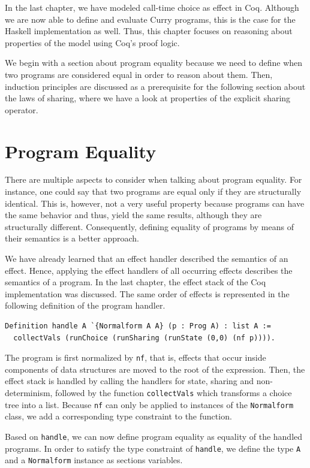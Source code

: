 \documentclass[a4paper, 11pt, fleqn, twoside, abstract=on]{scrreprt}
\newcommand{\cinl}[1]{\texttt{#1}}
\begin{document}
In the last chapter, we have modeled call-time choice as effect in Coq.
Although we are now able to define and evaluate Curry programs, this is the case for the Haskell implementation as well.
Thus, this chapter focuses on reasoning about properties of the model using Coq's proof logic.

We begin with a section about program equality because we need to define when two programs are considered equal in order to reason about them.
Then, induction principles are discussed as a prerequisite for the following section about the laws of sharing, where we have a look at properties
of the explicit sharing operator.

\section{Program Equality}

There are multiple aspects to consider when talking about program equality.
For instance, one could say that two programs are equal only if they are structurally identical.
This is, however, not a very useful property because programs can have the same behavior and thus, yield the same results, although they are structurally different.
Consequently, defining equality of programs by means of their semantics is a better approach.

We have already learned that an effect handler described the semantics of an effect.
Hence, applying the effect handlers of all occurring effects describes the semantics of a program.
In the last chapter, the effect stack of the Coq implementation was discussed.
The same order of effects is represented in the following definition of the program handler.

\begin{verbatim}
Definition handle A `{Normalform A A} (p : Prog A) : list A :=
  collectVals (runChoice (runSharing (runState (0,0) (nf p)))).
\end{verbatim}
\noindent
The program is first normalized by \cinl{nf}, that is, effects that occur inside components of data structures are moved to the root of the expression.
Then, the effect stack is handled by calling the handlers for state, sharing and non-determinism, followed by the function \cinl{collectVals} which transforms a choice tree into a list.
Because \cinl{nf} can only be applied to instances of the \cinl{Normalform} class, we add a corresponding type constraint to the function.

Based on \cinl{handle}, we can now define program equality as equality of the handled programs.
In order to satisfy the type constraint of \cinl{handle}, we define the type \cinl{A} and a \cinl{Normalform} instance as sections variables.
\end{document}
